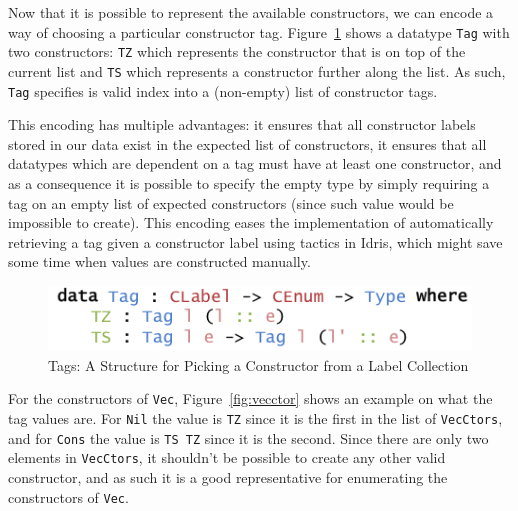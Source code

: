 \documentclass{ituthesis}
\newcommand{\ttconstructor}[1]{\textcolor{constructor-color}{\texttt{#1}}}
\newcommand{\tttype}[1]{\textcolor{type-color}{\texttt{#1}}}
\newcommand{\ttdec}[1]{\textcolor{declared-var-color}{\texttt{#1}}}
\begin{document}
Now that it is possible to represent the available constructors, we can encode a way of choosing a particular constructor tag. Figure~\ref{fig:ctortags} shows a datatype \tttype{Tag} with two constructors:
\ttconstructor{TZ} which represents the constructor that is on top of the current list and \ttconstructor{TS} which represents a constructor further along the list. As such, \tttype{Tag} specifies is valid index into a (non-empty) list of constructor tags.

This encoding has multiple advantages: it ensures that all constructor labels stored in our data exist in the expected list of constructors, it ensures that all datatypes which are dependent on a tag must have at least one constructor, and as a consequence
it is possible to specify the empty type by simply requiring a tag on an empty list of expected constructors (since such value would be impossible to create).
This encoding eases the implementation of automatically retrieving a tag given a constructor label using tactics in Idris, which might save some time when values
are constructed manually.

\begin{figure}[ht]
\begin{center}
    \includegraphics[scale=0.5]{Figures/AnInformativeEncodingofConstructorsTags.png}
\end{center}
\caption{Tags: A Structure for Picking a Constructor from a Label Collection}
\label{fig:ctortags}
\end{figure}

For the constructors of \tttype{Vec}, Figure~\ref{fig:vecctor} shows an example on what the tag values are. For \ttconstructor{Nil} the value is \ttconstructor{TZ} since it is the first in the list of \ttdec{VecCtors}, and for \ttconstructor{Cons} the value
is \ttconstructor{TS~TZ} since it is the second. Since there are only two elements in \ttdec{VecCtors}, it shouldn't be possible to create any other valid constructor, and as such it is a good representative for enumerating the constructors of \tttype{Vec}.
\end{document}
